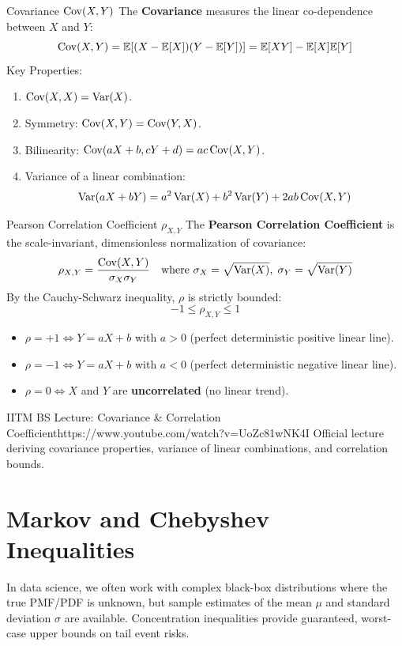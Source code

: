 \begin{definitionbox}{Covariance $\operatorname{Cov}(X, Y)$}
The \textbf{Covariance} measures the linear co-dependence between $X$ and $Y$:
$$\operatorname{Cov}(X, Y) = \mathbb{E}[(X - \mathbb{E}[X])(Y - \mathbb{E}[Y])] = \mathbb{E}[XY] - \mathbb{E}[X]\mathbb{E}[Y]$$
Key Properties:
\begin{enumerate}
    \item $\operatorname{Cov}(X, X) = \operatorname{Var}(X)$.
    \item Symmetry: $\operatorname{Cov}(X, Y) = \operatorname{Cov}(Y, X)$.
    \item Bilinearity: $\operatorname{Cov}(aX + b, cY + d) = ac \operatorname{Cov}(X, Y)$.
    \item Variance of a linear combination:
    $$\operatorname{Var}(aX + bY) = a^2 \operatorname{Var}(X) + b^2 \operatorname{Var}(Y) + 2ab \operatorname{Cov}(X, Y)$$
\end{enumerate}
\end{definitionbox}

\begin{formulabox}{Pearson Correlation Coefficient $\rho_{X,Y}$}
The \textbf{Pearson Correlation Coefficient} is the scale-invariant, dimensionless normalization of covariance:
$$\rho_{X,Y} = \frac{\operatorname{Cov}(X, Y)}{\sigma_X \sigma_Y} \quad \text{where } \sigma_X = \sqrt{\operatorname{Var}(X)}, \; \sigma_Y = \sqrt{\operatorname{Var}(Y)}$$
By the Cauchy-Schwarz inequality, $\rho$ is strictly bounded:
$$-1 \le \rho_{X,Y} \le 1$$
\begin{itemize}
    \item $\rho = +1 \iff Y = aX + b$ with $a > 0$ (perfect deterministic positive linear line).
    \item $\rho = -1 \iff Y = aX + b$ with $a < 0$ (perfect deterministic negative linear line).
    \item $\rho = 0 \iff X$ and $Y$ are \textbf{uncorrelated} (no linear trend).
\end{itemize}
\end{formulabox}

\begin{videocard}{IITM BS Lecture: Covariance \& Correlation Coefficient}{https://www.youtube.com/watch?v=UoZc81wNK4I}
Official lecture deriving covariance properties, variance of linear combinations, and correlation bounds.
\end{videocard}

\section{Markov and Chebyshev Inequalities}

In data science, we often work with complex black-box distributions where the true PMF/PDF is unknown, but sample estimates of the mean $\mu$ and standard deviation $\sigma$ are available. Concentration inequalities provide guaranteed, worst-case upper bounds on tail event risks.

